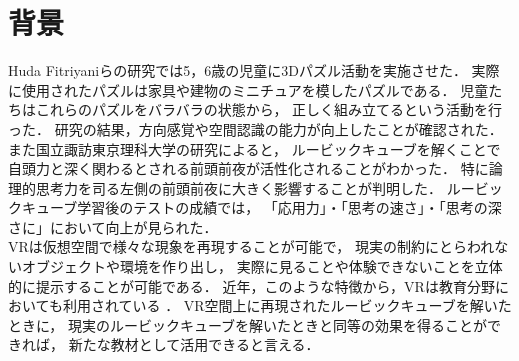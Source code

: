 \section{背景}
  Huda Fitriyaniらの研究\cite{puzzle}では5，6歳の児童に3Dパズル活動を実施させた．
  実際に使用されたパズルは家具や建物のミニチュアを模したパズルである．
  児童たちはこれらのパズルをバラバラの状態から，
  正しく組み立てるという活動を行った．
  研究の結果，方向感覚や空間認識の能力が向上したことが確認された．
  また国立諏訪東京理科大学の研究\cite{rubik}によると，
  ルービックキューブを解くことで
  自頭力と深く関わるとされる前頭前夜が活性化されることがわかった．
  特に論理的思考力を司る左側の前頭前夜に大きく影響することが判明した．
  ルービックキューブ学習後のテストの成績では，
  「応用力」・「思考の速さ」・「思考の深さに」において向上が見られた．
  \\\indent
  VRは仮想空間で様々な現象を再現することが可能で，
  現実の制約にとらわれないオブジェクトや環境を作り出し，
  実際に見ることや体験できないことを立体的に提示することが可能である．
  近年，このような特徴から，VRは教育分野においても利用されている
  \cite{全天球}\cite{授業実践}．
  VR空間上に再現されたルービックキューブを解いたときに，
  現実のルービックキューブを解いたときと同等の効果を得ることができれば，
  新たな教材として活用できると言える．
